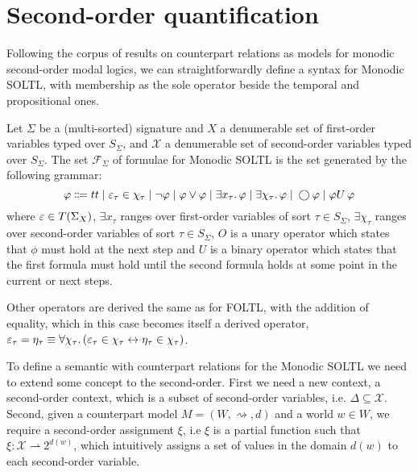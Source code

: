 \section{Second-order quantification}

Following the corpus of results on counterpart relations as models for monodic second-order modal logics, we can
straightforwardly define a syntax for Monodic \ac{SOLTL}, with membership as the sole operator beside the temporal and
propositional ones.

\begin{definition}
Let $\Sigma$ be a (multi-sorted) signature and $X$ a denumerable set of first-order variables typed over $S_\Sigma$, and
$\mathcal{X}$ a denumerable set of second-order variables typed over $S_\Sigma$. The set $\mathcal{F}_\Sigma$ of
formulae for Monodic \ac{SOLTL} is the set generated by the following grammar:
\[
  \varphi \Coloneqq tt \;|\; \varepsilon_\tau \in \chi_\tau
                    \;|\; \neg\varphi
                    \;|\; \varphi \lor \varphi
                    \;|\; \exists {x_\tau} \ldotp {\varphi}
                    \;|\; \exists {\chi_\tau} \ldotp {\varphi}
                    \;|\; \bigcirc{\varphi}
                    \;|\; {\varphi}U\,{\varphi}
\]
where $\varepsilon \in T({\Sigma}_{X})$, $\exists x_\tau$ ranges over first-order variables of sort $\tau \in S_\Sigma$,
$\exists \chi_\tau$ ranges over second-order variables of sort $\tau \in S_\Sigma$,
$O$ is a unary operator which states that $\phi$ must hold at the next step and $U$ is a binary operator which states
that the first formula must hold until the second formula holds at some point in the current or next steps.
\end{definition}

Other operators are derived the same as for \ac{FOLTL}, with the addition of equality, which in
this case becomes itself a derived operator, $\varepsilon_\tau = \eta_\tau \equiv \forall {\chi_\tau} \ldotp {(}\varepsilon_\tau \in
\chi_\tau \leftrightarrow \eta_\tau \in \chi_\tau)$.

To define a semantic with counterpart relations for the Monodic \ac{SOLTL} we need to extend some concept to the
second-order. First we need a new context, a second-order context, which is a subset of second-order variables, i.e.
$\Delta \subseteq \mathcal{X}$. Second, given a counterpart model $M = (W, \rightsquigarrow, d)$ and a world $w \in W$,
we require a second-order assignment $\xi$, i.e $\xi$ is a partial function such that $\xi : \mathcal{X} \rightharpoonup
2^{d(w)}$, which intuitively assigns a set of values in the domain $d(w)$ to each second-order variable.

